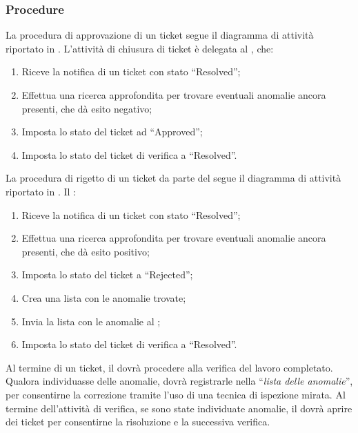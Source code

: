 \subsubsection{Procedure}\label{procedureVerifica}
La procedura di approvazione di un ticket segue il diagramma di attività riportato in .
L'attività di chiusura di ticket è delegata al \rV, che:
\begin{enumerate}
\item Riceve la notifica di un ticket con stato ``Resolved'';
\item Effettua una ricerca approfondita per trovare eventuali anomalie ancora presenti, che dà esito negativo;
\item Imposta lo stato del ticket ad ``Approved'';
\item Imposta lo stato del ticket di verifica a ``Resolved''.
\end{enumerate}
La procedura di rigetto di un ticket da parte del \rV segue il diagramma di attività riportato in .
Il \rV:
\begin{enumerate}
\item Riceve la notifica di un ticket con stato ``Resolved'';
\item Effettua una ricerca approfondita per trovare eventuali anomalie ancora presenti, che dà esito positivo;
\item Imposta lo stato del ticket a ``Rejected'';
\item Crea una lista con le anomalie trovate;
\item Invia la lista con le anomalie al \rRP;
\item Imposta lo stato del ticket di verifica a ``Resolved''.
\end{enumerate}
\label{procGestioneAnomalie}
Al termine di un ticket, il \rV dovrà procedere alla verifica del lavoro completato. Qualora individuasse delle anomalie, dovrà registrarle nella ``\emph{lista delle anomalie}'', per consentirne la correzione tramite l'uso di una tecnica di ispezione mirata. Al termine dell’attività di verifica, se sono state individuate anomalie, il \rRP dovrà aprire dei ticket per consentirne la risoluzione e la successiva verifica.
